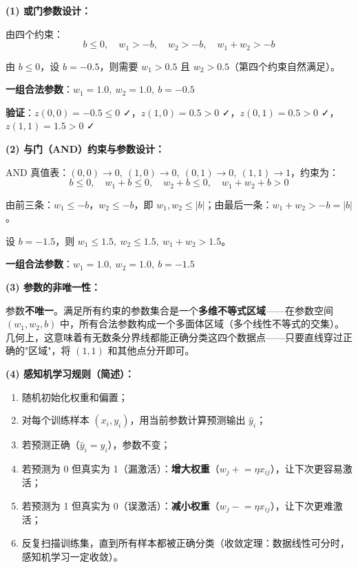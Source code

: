 \documentclass[a4paper,11pt]{ctexart}
\begin{document}
\begin{solutionbox}[参考答案与详细解析]
    \textbf{(1) 或门参数设计：}

    由四个约束：
    \[
    b \leq 0, \quad w_1 > -b, \quad w_2 > -b, \quad w_1 + w_2 > -b
    \]

    由 $b \leq 0$，设 $b = -0.5$，则需要 $w_1 > 0.5$ 且 $w_2 > 0.5$（第四个约束自然满足）。

    \textbf{一组合法参数}：$w_1 = 1.0,\ w_2 = 1.0,\ b = -0.5$

    \textbf{验证}：$z(0,0) = -0.5 \leq 0$ ✓，$z(1,0) = 0.5 > 0$ ✓，$z(0,1) = 0.5 > 0$ ✓，$z(1,1) = 1.5 > 0$ ✓

    \textbf{(2) 与门（AND）约束与参数设计：}

    AND 真值表：$(0,0)\to 0,\ (1,0)\to 0,\ (0,1)\to 0,\ (1,1)\to 1$，约束为：
    \[
    b \leq 0, \quad w_1 + b \leq 0, \quad w_2 + b \leq 0, \quad w_1 + w_2 + b > 0
    \]

    由前三条：$w_1 \leq -b$，$w_2 \leq -b$，即 $w_1, w_2 \leq |b|$；由最后一条：$w_1 + w_2 > -b = |b|$。

    设 $b = -1.5$，则 $w_1 \leq 1.5,\ w_2 \leq 1.5,\ w_1 + w_2 > 1.5$。

    \textbf{一组合法参数}：$w_1 = 1.0,\ w_2 = 1.0,\ b = -1.5$

    \textbf{(3) 参数的非唯一性：}

    参数\textbf{不唯一}。满足所有约束的参数集合是一个\textbf{多维不等式区域}——在参数空间 $(w_1, w_2, b)$ 中，所有合法参数构成一个多面体区域（多个线性不等式的交集）。几何上，这意味着有无数条分界线都能正确分类这四个数据点——只要直线穿过正确的"区域"，将 $(1,1)$ 和其他点分开即可。

    \textbf{(4) 感知机学习规则（简述）：}

    \begin{keybox}[感知机学习规则的思路]
        \begin{enumerate}
            \item 随机初始化权重和偏置；
            \item 对每个训练样本 $(x_i, y_i)$，用当前参数计算预测输出 $\hat{y}_i$；
            \item 若预测正确（$\hat{y}_i = y_i$），参数不变；
            \item 若预测为 0 但真实为 1（漏激活）：\textbf{增大权重}（$w_j \mathrel{+}= \eta x_{ij}$），让下次更容易激活；
            \item 若预测为 1 但真实为 0（误激活）：\textbf{减小权重}（$w_j \mathrel{-}= \eta x_{ij}$），让下次更难激活；
            \item 反复扫描训练集，直到所有样本都被正确分类（收敛定理：数据线性可分时，感知机学习一定收敛）。
        \end{enumerate}
    \end{keybox}
\end{solutionbox}
\end{document}
